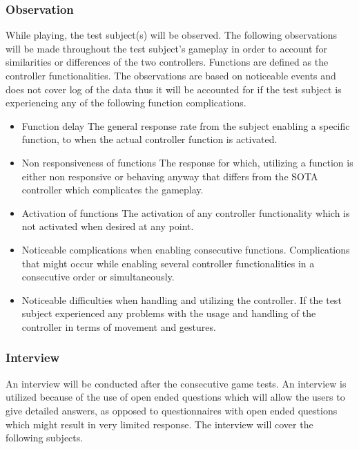 \subsubsection{Observation}
While playing, the test subject(s) will be observed. 
The following observations will be made throughout the test subject’s gameplay in order to account for similarities or differences of the two controllers. 
Functions are defined as the controller functionalities. 
The observations are based on noticeable events and does not cover log of the data thus it will be accounted for if the test subject is experiencing any of the following function complications.

\begin{itemize}
	\item Function delay\newline
		The general response rate from the subject enabling a specific function, to when the actual controller function is 				activated.
	\item Non responsiveness of functions\newline
		The response for which, utilizing a function is either non responsive or behaving anyway that differs from the SOTA 			controller which complicates the gameplay.
	\item Activation of functions\newline
		The activation of any controller functionality which is not activated when desired at any point.
	\item Noticeable complications when enabling consecutive functions.\newline
		Complications that might occur while enabling several controller functionalities in a consecutive order or 						simultaneously.
	\item Noticeable difficulties when handling and utilizing the controller.\newline
		If the test subject experienced any problems with the usage and handling of the controller in terms of movement and 			gestures.
\end{itemize}


\subsubsection{Interview} \label{sec:interview}
An interview will be conducted after the consecutive game tests. 
An interview is utilized because of the use of open ended questions which will allow the users to give detailed answers, as opposed to questionnaires with open ended questions which might result in very limited response.  
The interview will cover the following subjects.

